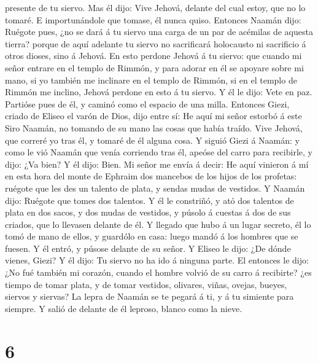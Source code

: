 presente de tu siervo.  Mas él dijo: Vive Jehová, delante
del cual estoy, que no lo tomaré. E importunándole que tomase, él nunca
quiso.  Entonces Naamán dijo: Ruégote pues, ¿no se dará á
tu siervo una carga de un par de acémilas de aquesta tierra? porque de
aquí adelante tu siervo no sacrificará holocausto ni sacrificio á otros
dioses, sino á Jehová.  En esto perdone Jehová á tu siervo:
que cuando mi señor entrare en el templo de Rimmón, y para adorar en él
se apoyare sobre mi mano, si yo también me inclinare en el templo de
Rimmón, si en el templo de Rimmón me inclino, Jehová perdone en esto á
tu siervo.  Y él le dijo: Vete en paz. Partióse pues de él,
y caminó como el espacio de una milla.  Entonces Giezi,
criado de Eliseo el varón de Dios, dijo entre sí: He aquí mi señor
estorbó á este Siro Naamán, no tomando de su mano las cosas que había
traído. Vive Jehová, que correré yo tras él, y tomaré de él alguna cosa.
 Y siguió Giezi á Naamán: y como le vió Naamán que venía
corriendo tras él, apeóse del carro para recibirle, y dijo: ¿Va bien?
 Y él dijo: Bien. Mi señor me envía á decir: He aquí
vinieron á mí en esta hora del monte de Ephraim dos mancebos de los
hijos de los profetas: ruégote que les des un talento de plata, y sendas
mudas de vestidos.  Y Naamán dijo: Ruégote que tomes dos
talentos. Y él le constriñó, y ató dos talentos de plata en dos sacos, y
dos mudas de vestidos, y púsolo á cuestas á dos de sus criados, que lo
llevasen delante de él.  Y llegado que hubo á un lugar
secreto, él lo tomó de mano de ellos, y guardólo en casa: luego mandó á
los hombres que se fuesen.  Y él entró, y púsose delante de
su señor. Y Eliseo le dijo: ¿De dónde vienes, Giezi? Y él dijo: Tu
siervo no ha ido á ninguna parte.  El entonces le dijo: ¿No
fué también mi corazón, cuando el hombre volvió de su carro á recibirte?
¿es tiempo de tomar plata, y de tomar vestidos, olivares, viñas, ovejas,
bueyes, siervos y siervas?  La lepra de Naamán se te pegará
á ti, y á tu simiente para siempre. Y salió de delante de él leproso,
blanco como la nieve.

\hypertarget{section-5}{%
\section{6}\label{section-5}}

